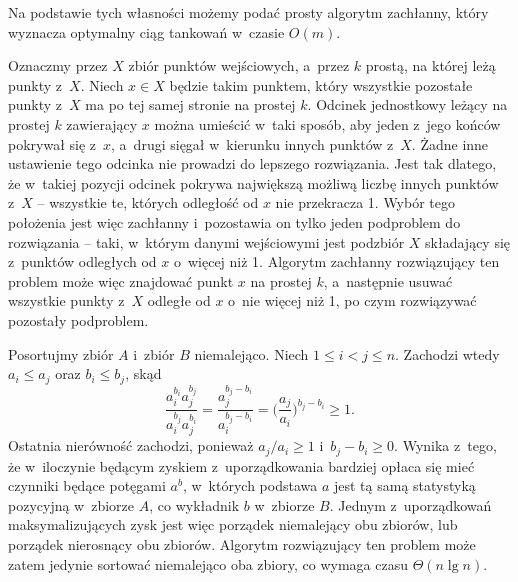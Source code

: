 Na podstawie tych własności możemy podać prosty algorytm zachłanny, który wyznacza optymalny ciąg tankowań w~czasie $O(m)$.

\exercise %
Oznaczmy przez $X$ zbiór punktów wejściowych, a~przez $k$ prostą, na której leżą punkty z~$X$.
Niech $x\in X$ będzie takim punktem, który wszystkie pozostałe punkty z~$X$ ma po tej samej stronie na prostej $k$.
Odcinek jednostkowy leżący na prostej $k$ zawierający $x$ można umieścić w~taki sposób, aby jeden z~jego końców pokrywał się z~$x$, a~drugi sięgał w~kierunku innych punktów z~$X$.
Żadne inne ustawienie tego odcinka nie prowadzi do lepszego rozwiązania.
Jest tak dlatego, że w~takiej pozycji odcinek pokrywa największą możliwą liczbę innych punktów z~$X$ -- wszystkie te, których odległość od $x$ nie przekracza 1.
Wybór tego położenia jest więc zachłanny i~pozostawia on tylko jeden podproblem do rozwiązania -- taki, w~którym danymi wejściowymi jest podzbiór $X$ składający się z~punktów odległych od $x$ o~więcej niż 1.
Algorytm zachłanny rozwiązujący ten problem może więc znajdować punkt $x$ na prostej $k$, a~następnie usuwać wszystkie punkty z~$X$ odległe od $x$ o~nie więcej niż 1, po czym rozwiązywać pozostały podproblem.

\exercise %
\exercise %
Posortujmy zbiór $A$ i~zbiór $B$ niemalejąco.
Niech $1\le i<j\le n$.
Zachodzi wtedy $a_i\le a_j$ oraz $b_i\le b_j$, skąd
\[
	\frac{a_i^{b_i}a_j^{b_j}}{a_i^{b_j}a_j^{b_i}} = \frac{a_j^{b_j-b_i}}{a_i^{b_j-b_i}} = \biggl(\frac{a_j}{a_i}\biggr)^{b_j-b_i} \ge 1.
\]
Ostatnia nierówność zachodzi, ponieważ $a_j/a_i\ge1$ i~$b_j-b_i\ge0$.
Wynika z~tego, że w~iloczynie będącym zyskiem z~uporządkowania bardziej opłaca się mieć czynniki będące potęgami $a^b$, w~których podstawa $a$ jest tą samą statystyką pozycyjną w~zbiorze $A$, co wykładnik $b$ w~zbiorze $B$.
Jednym z~uporządkowań maksymalizujących zysk jest więc porządek niemalejący obu zbiorów, lub porządek nierosnący obu zbiorów.
Algorytm rozwiązujący ten problem może zatem jedynie sortować niemalejąco oba zbiory, co wymaga czasu $\Theta(n\lg n)$.
